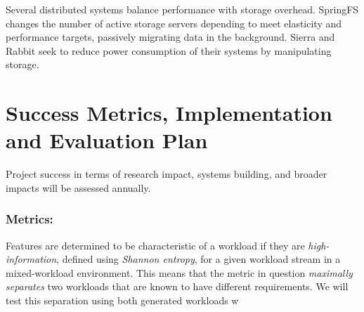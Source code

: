 
Several distributed systems balance performance with storage overhead.
SpringFS \cite{xu2014springfs} changes the number of active storage servers
depending to meet elasticity and performance targets, passively migrating
data in the background.
Sierra \cite{sierra} and Rabbit \cite{amur2010robust} seek to reduce power consumption
of their systems by manipulating storage. %

\section{Success Metrics, Implementation and Evaluation Plan}%

Project success in terms of research impact,
systems building, and broader impacts will be assessed annually. 

\subsubsection*{Metrics: }

Features are determined to be characteristic of a workload if they are
\emph{high-information}, defined using \emph{Shannon entropy}, for a given workload stream in a mixed-workload environment.  This
means that the metric in question \emph{maximally separates} two workloads that are
known to have different requirements.  We will test this separation using both
generated workloads w






